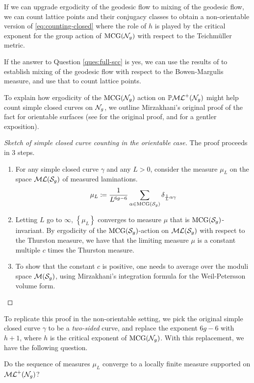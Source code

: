 If we can upgrade ergodicity of the geodesic flow to mixing of the geodesic flow, we can count lattice points and their conjugacy classes to obtain a non-orientable version of \eqref{eq:counting-closed} where the role of $h$ is played by the critical exponent for the group action of $\mathrm{MCG}(\mathcal{N}_g)$ with respect to the Teichmüller metric.

If the answer to Question \ref{ques:full-scc} is yes, we can use the results of \textcite{CGTY} to establish mixing of the geodesic flow with respect to the Bowen-Margulis measure, and use that to count lattice points.

To explain how ergodicity of the $\mathrm{MCG}(\mathcal{N}_g)$ action on $\mathbb{P}\mathcal{ML}^+(\mathcal{N}_g)$ might help count simple closed curves on $\mathcal{N}_g$, we outline Mirzakhani's original proof of the fact for orientable surfaces (see \cite{mirzakhani2008growth} for the original proof, and \cite{2022arXiv220204156A} for a gentler exposition).

\begin{proof}[Sketch of simple closed curve counting in the orientable case]
  The proof proceeds in 3 steps.
  \begin{enumerate}[Step 1:]
  \item For any simple closed curve $\gamma$ and any $L > 0$, consider the measure $\mu_L$ on the space $\mathcal{ML}(\mathcal{S}_g)$ of measured laminations.
    \begin{align*}
      \mu_L \coloneqq \frac{1}{L^{6g-6}} \sum_{\alpha \in \mathrm{MCG}(\mathcal{S}_g)} \delta_{\frac{1}{L}\alpha \gamma}
    \end{align*}
  \item Letting $L$ go to $\infty$, $\left\{ \mu_L \right\}$ converges to measure $\mu$ that is $\mathrm{MCG}(\mathcal{S}_g)$-invariant.
    By ergodicity of the $\mathrm{MCG}(\mathcal{S}_g)$-action on $\mathcal{ML}(\mathcal{S}_g)$ with respect to the Thurston measure, we have that the limiting measure $\mu$ is a constant multiple $c$ times the Thurston measure.
  \item To show that the constant $c$ is positive, one needs to average over the moduli space $\mathcal{M}(\mathcal{S}_g)$, using Mirzakhani's integration formula for the Weil-Petersson volume form.
  \end{enumerate}
\end{proof}

To replicate this proof in the non-orientable setting, we pick the original simple closed curve $\gamma$ to be a \emph{two-sided} curve, and replace the exponent $6g-6$ with $h + 1$, where $h$ is the critical exponent of $\mathrm{MCG}(\mathcal{N}_g)$.
With this replacement, we have the following question.
\begin{question}
  Do the sequence of measures $\mu_L$ converge to a locally finite measure supported on $\mathcal{ML}^+(\mathcal{N}_g)$?
\end{question}

